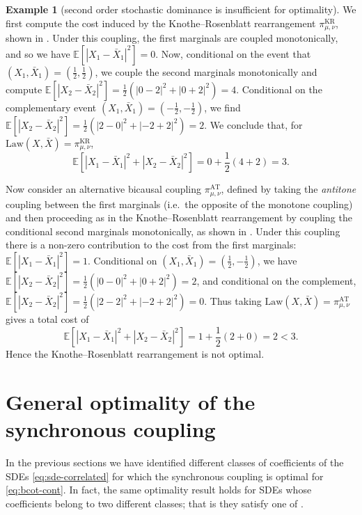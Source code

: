 \documentclass[onseside, final]{amsart}
\theoremstyle{definition}
\newtheorem{example}[theorem]{Example}
\newcommand{\E}{\mathbb E}
\newcommand{\Law}{\mathrm{Law}}
\newcommand{\kr}{\mathrm{KR}}
\newcommand{\antitone}{\mathrm{AT}}
\numberwithin{equation}{section}
\begin{document}
\begin{example}[second order stochastic dominance is insufficient for optimality]
			We first compute the cost induced by the Knothe--Rosenblatt rearrangement $\pi^{\kr}_{\mu, \nu}$, shown in . Under this coupling, the first marginals are coupled monotonically, and so we have $\E[|X_1 - \bar X_1|^2] = 0$. Now, conditional on the event that $(X_1, \bar X_1) = (\frac12, \frac12)$, we couple the second marginals monotonically and compute $\E[|X_2 - \bar X_2|^2] = \frac12(|0 - 2|^2 + |0+2|^2) = 4$. Conditional on the complementary event $(X_1, \bar X_1) = (-\frac12, -\frac12)$, we find $\E[|X_2 - \bar X_2|^2] = \frac12(|2 - 0|^2 + |-2 + 2|^2) = 2$. We conclude that, for $\Law(X, \bar X) = \pi^\kr_{\mu, \nu}$,
			\begin{equation}
				\E\!\left[|X_1 - \bar X_1|^2 + |X_2 - \bar X_2|^2\right]\! = 0 + \frac12(4 + 2) = 3.
			\end{equation}
			
			Now consider an alternative bicausal coupling $\pi^\antitone_{\mu, \nu}$, defined by taking the \emph{antitone} coupling between the first marginals (i.e.~the opposite of the monotone coupling) and then proceeding as in the Knothe--Rosenblatt rearrangement by coupling the conditional second marginals monotonically, as shown in . Under this coupling there is a non-zero contribution to the cost from the first marginals: $\E[|X_1 - \bar X_1|^2] = 1$. Conditional on $(X_1, \bar X_1) = (\frac12, - \frac12)$, we have $\E[|X_2 - \bar X_2|^2] = \frac12(|0 - 0|^2 + |0 + 2|^2) = 2$, and conditional on the complement, $\E[|X_2 - \bar X_2|^2] = \frac12(|2 - 2|^2 + |-2 + 2|^2) = 0$. Thus taking $\Law(X, \bar X) = \pi^\antitone_{\mu, \nu}$ gives a total cost of
			\begin{equation}
				\E\!\left[|X_1 - \bar X_1|^2 + |X_2 - \bar X_2|^2\right]\! = 1 + \frac12(2 + 0) = 2 < 3.
			\end{equation}
			Hence the Knothe--Rosenblatt rearrangement is not optimal.
		\end{example}
		
\section{General optimality of the synchronous coupling}\label{sec:mixing-assumptions}

	In the previous sections we have identified different classes of coefficients of the SDEs \eqref{eq:sde-correlated} for which the synchronous coupling is optimal for \eqref{eq:bcot-cont}.
	In fact, the same optimality result holds for SDEs whose coefficients belong to two different classes; that is they satisfy one of .
	
\end{document}
